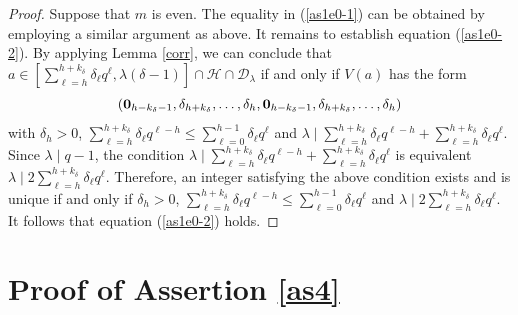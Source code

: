 \documentclass[journal,onecolumn]{IEEEtran}
\begin{document}
\begin{proof}
Suppose that $m$ is even. The equality in (\ref{as1e0-1}) can be obtained by  employing  a similar argument as above.  It remains to  establish equation (\ref{as1e0-2}). By applying Lemma \ref{corr},  
we can conclude that 
$a\in \left[\sum\limits_{\ell=h}^{h+k_{\delta}}\delta_{\ell}q^{\ell}, \lambda(\delta-1)\right]\cap \mathcal{H}\cap \mathcal{D}_{\lambda}$ if and only if $V(a)$ has the form 
\begin{equation}\notag
(\mathbf{0}_{h-k_{\delta}-1},\delta_{h+k_{\delta}},\ldots,\delta_h, \mathbf{0}_{h-k_{\delta}-1},\delta_{h+k_{\delta}},\ldots,\delta_h)
\end{equation}
 with $\delta_h>0$,   $\sum\limits_{\ell=h}^{h+k_{\delta}}\delta_{\ell}q^{\ell-h}\leq\sum\limits_{\ell=0}^{h-1}\delta_{\ell}q^{\ell}$ and $\lambda \mid \sum\limits_{\ell=h}^{h+k_{\delta}}\delta_{\ell}q^{\ell-h}+\sum\limits_{\ell=h}^{h+k_{\delta}}\delta_{\ell}q^{\ell}$. Since $\lambda\mid q-1$, the condition   $\lambda \mid \sum\limits_{\ell=h}^{h+k_{\delta}}\delta_{\ell}q^{\ell-h}+\sum\limits_{\ell=h}^{h+k_{\delta}}\delta_{\ell}q^{\ell}$ is equivalent $\lambda \mid 2\sum\limits_{\ell=h}^{h+k_{\delta}}\delta_{\ell}q^{\ell}.$ 
 Therefore,  an integer satisfying the above condition exists and is unique if and only if  $\delta_h>0$, $\sum\limits_{\ell=h}^{h+k_{\delta}}\delta_{\ell}q^{\ell-h}\leq \sum\limits_{\ell=0}^{h-1}\delta_{\ell}q^{\ell}$ and $\lambda \mid 2\sum\limits_{\ell=h}^{h+k_{\delta}}\delta_{\ell}q^{\ell}$. 
It follows that equation (\ref{as1e0-2}) holds. 
\end{proof}

\section{Proof of Assertion \ref{as4}}
\end{document}
